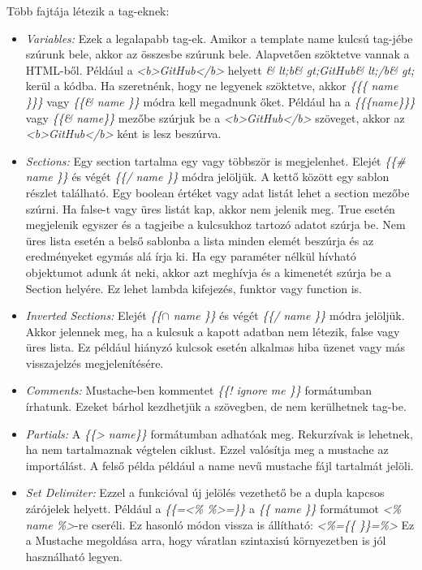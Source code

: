 Több fajtája létezik a tag-eknek:
\begin{itemize}
\item \emph{Variables:}
Ezek a legalapabb tag-ek.
Amikor a template name kulcsú tag-jébe szúrunk bele, akkor az összesbe szúrunk bele.
Alapvetően szöktetve vannak a HTML-ből.
Például a \textit{<b>GitHub</b>} helyett \textit{\& lt;b\& gt;GitHub\& lt;/b\& gt;} kerül a kódba.
Ha szeretnénk, hogy ne legyenek szöktetve, akkor \textit{\{\{\{ name \}\}\}} vagy \textit{\{\{\& name \}\}} módra kell megadnunk őket.
Például ha a \textit{\{\{\{name\}\}\}} vagy \textit{\{\{\& name\}\}} mezőbe szúrjuk be a \textit{<b>GitHub</b>} szöveget, akkor az \textit{<b>GitHub</b>} ként is lesz beszúrva.
\item \emph{Sections:}
Egy section tartalma egy vagy többször is megjelenhet.
Elejét \textit{\{\{\# name \}\}} és végét \textit{\{\{/ name \}\}} módra jelöljük.
A kettő között egy sablon részlet található.
Egy boolean értéket vagy adat listát lehet a section mezőbe szúrni.
Ha false-t vagy üres listát kap, akkor nem jelenik meg.
True esetén megjelenik egyszer és a tagjeibe a kulcsukhoz tartozó adatot szúrja be.
Nem üres lista esetén a belső sablonba a lista minden elemét beszúrja és az eredményeket egymás alá írja ki.
Ha egy paraméter nélkül hívható objektumot adunk át neki, akkor azt meghívja és a kimenetét szúrja be a Section helyére.
Ez lehet lambda kifejezés, funktor vagy function is.
\item \emph{Inverted Sections:}
Elejét \textit{\{\{$\cap$ name \}\}} és végét \textit{\{\{/ name \}\}} módra jelöljük.
Akkor jelennek meg, ha a kulcsuk a kapott adatban nem létezik, false vagy üres lista.
Ez például hiányzó kulcsok esetén alkalmas hiba üzenet vagy más visszajelzés megjelenítésére.
\item \emph{Comments:}
Mustache-ben kommentet \textit{\{\{! ignore me \}\}} formátumban írhatunk.
Ezeket bárhol kezdhetjük a szövegben, de nem kerülhetnek tag-be.
\item \emph{Partials:}
A \textit{\{\{> name\}\}} formátumban adhatóak meg.
Rekurzívak is lehetnek, ha nem tartalmaznak végtelen ciklust.
Ezzel valósítja meg a mustache az importálást.
A felső példa például a name nevű mustache fájl tartalmát jelöli.
\item \emph{Set Delimiter:}
Ezzel a funkcióval új jelölés vezethető be a dupla kapcsos zárójelek helyett.
Például a \textit{\{\{=<\% \%>=\}\}} a \textit{\{\{ name \}\}} formátumot \textit{<\% name \%>}-re cseréli.
Ez hasonló módon vissza is állítható: \textit{<\%=\{\{ \}\}=\%>}
Ez a Mustache megoldása arra, hogy váratlan szintaxisú környezetben is jól használható legyen.
\end{itemize}

